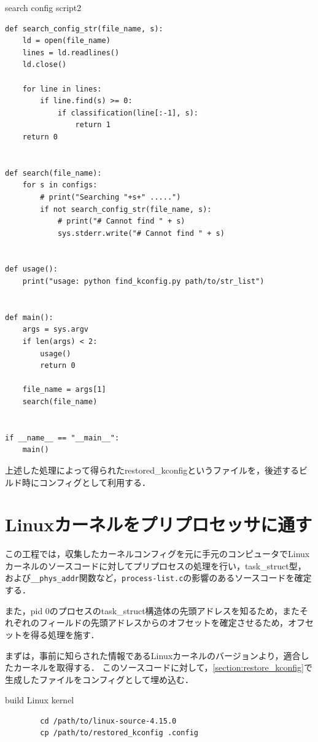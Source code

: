 \begin{itembox}[l]{search config script2}
    \begin{verbatim}
def search_config_str(file_name, s):
    ld = open(file_name)
    lines = ld.readlines()
    ld.close()

    for line in lines:
        if line.find(s) >= 0:
            if classification(line[:-1], s):
                return 1
    return 0


def search(file_name):
    for s in configs:
        # print("Searching "+s+" .....")
        if not search_config_str(file_name, s):
            # print("# Cannot find " + s)
            sys.stderr.write("# Cannot find " + s)


def usage():
    print("usage: python find_kconfig.py path/to/str_list")


def main():
    args = sys.argv
    if len(args) < 2:
        usage()
        return 0

    file_name = args[1]
    search(file_name)


if __name__ == "__main__":
    main()

    \end{verbatim}
\end{itembox}

上述した処理によって得られたrestored_kconfigというファイルを，後述するビルド時にコンフィグとして利用する．

\section{Linuxカーネルをプリプロセッサに通す}
\label{section:preprocess}

この工程では，収集したカーネルコンフィグを元に手元のコンピュータでLinuxカーネルのソースコードに対してプリプロセスの処理を行い，task\_struct型，
および\verb|__phys_addr|関数など，\verb|process-list.c|の影響のあるソースコードを確定する．

また，pid 0のプロセスのtask\_struct構造体の先頭アドレスを知るため，またそれぞれのフィールドの先頭アドレスからのオフセットを確定させるため，オフセットを得る処理を施す．

まずは，事前に知らされた情報であるLinuxカーネルのバージョンより，適合したカーネルを取得する．
このソースコードに対して，\ref{section:restore_kconfig}で生成したファイルをコンフィグとして埋め込む．

\begin{itembox}[l]{build Linux kernel}
    \begin{verbatim}
        cd /path/to/linux-source-4.15.0
        cp /path/to/restored_kconfig .config
    \end{verbatim}
\end{itembox}

